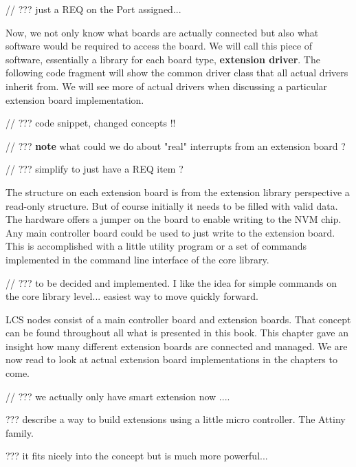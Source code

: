 
// ??? just a REQ on the Port assigned...

Now, we not only know what boards are actually connected but also what software would be required to access the board. We will call this piece of software, essentially a library for each board type, \textbf{extension driver}. The following code fragment will show the common driver class that all actual drivers inherit from. We will see more of actual drivers when discussing a particular extension board implementation.

// ??? code snippet, changed concepts !!

// ??? \textbf{note} what could we do about "real" interrupts from an extension board ?


// ??? simplify to just have a REQ item ?

The structure on each extension board is from the extension library perspective a read-only structure. But of course initially it needs to be filled with valid data. The hardware offers a jumper on the board to enable writing to the NVM chip. Any main controller board could be used to just write to the extension board. This is accomplished with a little utility program or a set of commands implemented in the command line interface of the core library.

// ??? to be decided and implemented. I like the idea for simple commands on the core library level... easiest way to move quickly forward.


LCS nodes consist of a main controller board and extension boards. That concept can be found throughout all what is presented in this book. This chapter gave an insight how many different extension boards are connected and managed. We are now read to look at actual extension board implementations in the chapters to come.



// ??? we actually only have smart extension now ....




??? describe a way to build extensions using a little micro controller. The Attiny family. 

??? it fits nicely into the concept but is much more powerful...



